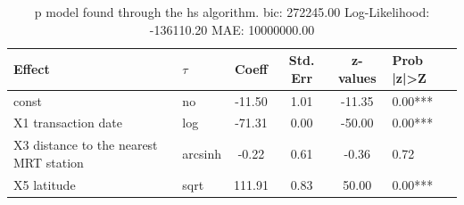 \begin{table}
	\caption{p model found through the hs algorithm. bic: 272245.00 Log-Likelihood: -136110.20 MAE: 10000000.00}
	\begin{center}
		\begin{tabular}{|l|l|c|c|c|l|}
			\hline
			Effect & $\tau$ & Coeff & Std. Err & z-values & Prob |z|>Z \\
			\hline
			const & no & -11.50 & 1.01 & -11.35 & 0.00*** \\
			\hline
			X1 transaction date & log & -71.31 & 0.00 & -50.00 & 0.00*** \\
			\hline
			X3 distance to the nearest MRT station & arcsinh & -0.22 & 0.61 & -0.36 & 0.72 \\
			\hline
			X5 latitude & sqrt & 111.91 & 0.83 & 50.00 & 0.00*** \\
			\hline
		\end{tabular}
	\end{center}
\end{table}